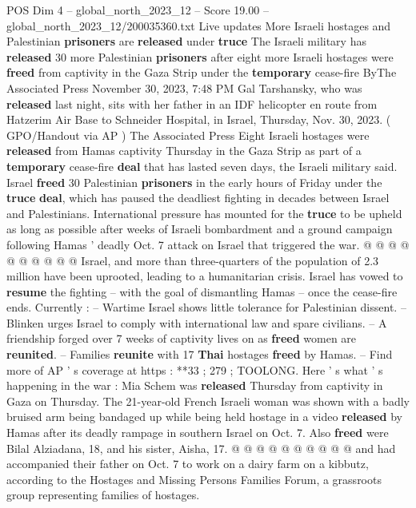 \begin{textsample}{POS Dim 4 – global\_north\_2023\_12 – Score 19.00 – global\_north\_2023\_12/200035360.txt}  \label{ex:f4_pos_309}
Live updates More Israeli hostages and Palestinian \textbf{prisoners} are \textbf{released} under \textbf{truce} The Israeli military has \textbf{released} 30 more Palestinian \textbf{prisoners} after eight more Israeli hostages were \textbf{freed} from captivity in the Gaza Strip under the \textbf{temporary} cease-fire ByThe Associated Press November 30, 2023, 7:48 PM Gal Tarshansky, who was \textbf{released} last night, sits with her father in an IDF helicopter en route from Hatzerim Air Base to Schneider Hospital, in Israel, Thursday, Nov. 30, 2023. ( GPO/Handout via AP ) The Associated Press Eight Israeli hostages were \textbf{released} from Hamas captivity Thursday in the Gaza Strip as part of a \textbf{temporary} cease-fire \textbf{deal} that has lasted seven days, the Israeli military said.
Israel \textbf{freed} 30 Palestinian \textbf{prisoners} in the early hours of Friday under the \textbf{truce} \textbf{deal}, which has paused the deadliest fighting in decades between Israel and Palestinians.
International pressure has mounted for the \textbf{truce} to be upheld as long as possible after weeks of Israeli bombardment and a ground campaign following Hamas ' deadly Oct. 7 attack on Israel that triggered the war. @ @ @ @ @ @ @ @ @ @ Israel, and more than three-quarters of the population of 2.3 million have been uprooted, leading to a humanitarian crisis.
Israel has vowed to \textbf{resume} the fighting -- with the goal of dismantling Hamas -- once the cease-fire ends.
Currently : -- Wartime Israel shows little tolerance for Palestinian dissent. -- Blinken urges Israel to comply with international law and spare civilians. -- A friendship forged over 7 weeks of captivity lives on as \textbf{freed} women are \textbf{reunited}. -- Families \textbf{reunite} with 17 \textbf{Thai} hostages \textbf{freed} by Hamas. -- Find more of AP ' s coverage at https : **33 ; 279 ; TOOLONG.
Here ' s what ' s happening in the war : Mia Schem was \textbf{released} Thursday from captivity in Gaza on Thursday.
The 21-year-old French Israeli woman was shown with a badly bruised arm being bandaged up while being held hostage in a video \textbf{released} by Hamas after its deadly rampage in southern Israel on Oct. 7.
Also \textbf{freed} were Bilal Alziadana, 18, and his sister, Aisha, 17. @ @ @ @ @ @ @ @ @ @ and had accompanied their father on Oct. 7 to work on a dairy farm on a kibbutz, according to the Hostages and Missing Persons Families Forum, a grassroots group representing families of hostages.

\end{textsample}
